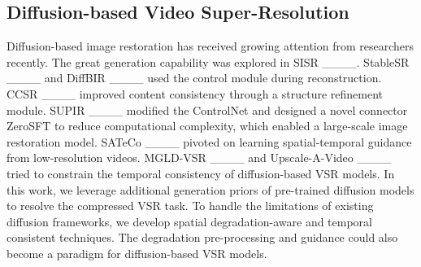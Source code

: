 \subsection{Diffusion-based Video Super-Resolution}
Diffusion-based image restoration has received growing attention from researchers recently. The great generation capability was explored in SISR ____. StableSR ____ and DiffBIR ____ used the control module during reconstruction. CCSR ____ improved content consistency through a structure refinement module. SUPIR ____ modified the ControlNet and designed a novel connector ZeroSFT to reduce computational complexity, which enabled a large-scale image restoration model. SATeCo ____ pivoted on learning spatial-temporal guidance from low-resolution videos. MGLD-VSR ____ and Upscale-A-Video ____ tried to constrain the temporal consistency of diffusion-based VSR models. In this work, we leverage additional generation priors of pre-trained diffusion models to resolve the compressed VSR task. To handle the limitations of existing diffusion frameworks, we develop spatial degradation-aware and temporal consistent techniques. The degradation pre-processing and guidance could also become a paradigm for diffusion-based VSR models.